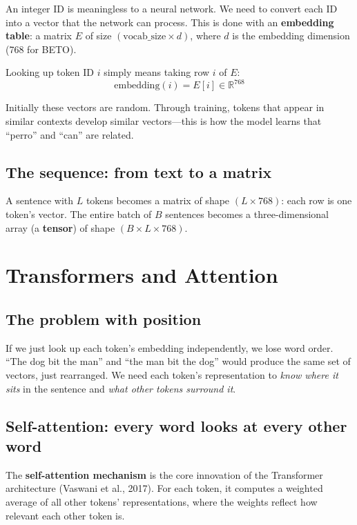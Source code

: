 \documentclass[11pt,a4paper]{article}
\theoremstyle{definition}
\begin{document}
An integer ID is meaningless to a neural network. We need to convert
each ID into a vector that the network can process. This is done with
an \textbf{embedding table}: a matrix $E$ of size
$(\text{vocab\_size} \times d)$, where $d$ is the embedding dimension
(768 for BETO).

Looking up token ID $i$ simply means taking row $i$ of $E$:
\[
\text{embedding}(i) = E[i] \in \mathbb{R}^{768}
\]

Initially these vectors are random. Through training, tokens that
appear in similar contexts develop similar vectors---this is how the
model learns that ``perro'' and ``can'' are related.

\subsection{The sequence: from text to a matrix}

A sentence with $L$ tokens becomes a matrix of shape $(L \times 768)$:
each row is one token's vector. The entire batch of $B$ sentences
becomes a three-dimensional array (a \textbf{tensor}) of shape
$(B \times L \times 768)$.

\section{Transformers and Attention}
\label{sec:transformers}

\subsection{The problem with position}

If we just look up each token's embedding independently, we lose word
order. ``The dog bit the man'' and ``the man bit the dog'' would
produce the same set of vectors, just rearranged. We need each
token's representation to \emph{know where it sits} in the sentence
and \emph{what other tokens surround it}.

\subsection{Self-attention: every word looks at every other word}

The \textbf{self-attention mechanism} is the core innovation of the
Transformer architecture (Vaswani et al., 2017). For each token, it
computes a weighted average of all other tokens' representations,
where the weights reflect how relevant each other token is.
\end{document}
